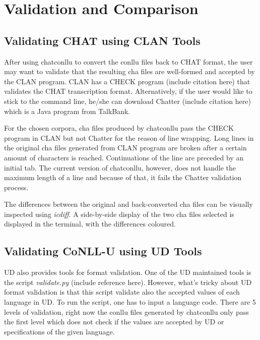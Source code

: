 \chapter{Validation and Comparison} %

\label{Chapter5} %

\section{Validating CHAT using CLAN Tools}

After using chatconllu to convert the conllu files back to CHAT format, the user may want to validate that the resulting cha files are well-formed and accepted by the CLAN program. CLAN has a CHECK program (include citation here) that validates the CHAT transcription format. Alternatively, if the user would like to stick to the command line, he/she can download Chatter (include citation here) which is a Java program from TalkBank. 


For the chosen corpora, cha files produced by chatconllu pass the CHECK program in CLAN but not Chatter for the reason of line wrapping. Long lines in the original cha files generated from CLAN program are broken after a certain amount of characters is reached. Continuations of the line are preceded by an initial tab. The current version of chatconllu, however, does not handle the maximum length of a line and because of that, it fails the Chatter validation process.

The differences between the original and back-converted cha files can be visually inspected using \emph{icdiff}. A side-by-side display of the two cha files selected is displayed in the terminal, with the differences coloured. 

\section{Validating CoNLL-U using UD Tools}

UD also provides tools for format validation. One of the UD maintained tools is the script \emph{validate.py} (include reference here). However, what's tricky about UD format validation is that this script validate also the accepted values of each language in UD. To run the script, one has to input a language code. There are 5 levels of validation, right now the conllu files generated by chatconllu only pass the first level which does not check if the values are accepted by UD or specifications of the given language.